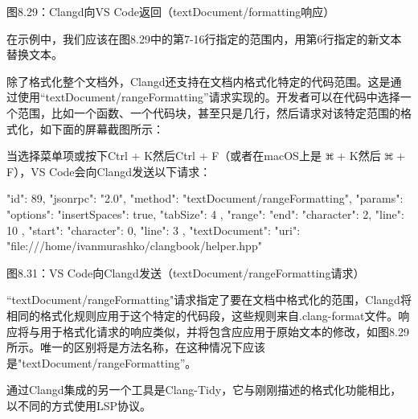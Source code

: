 \begin{center}
图8.29：Clangd向VS Code返回（textDocument/formatting响应）
\end{center}

在示例中，我们应该在图8.29中的第7-16行指定的范围内，用第6行指定的新文本替换文本。


除了格式化整个文档外，Clangd还支持在文档内格式化特定的代码范围。这是通过使用“textDocument/rangeFormatting”请求实现的。开发者可以在代码中选择一个范围，比如一个函数、一个代码块，甚至只是几行，然后请求对该特定范围的格式化，如下面的屏幕截图所示：


当选择菜单项或按下Ctrl + K然后Ctrl + F（或者在macOS上是 \includegraphics[width=0.02\textwidth]{content/part2/chapter8/images/3.png} + K然后 \includegraphics[width=0.02\textwidth]{content/part2/chapter8/images/3.png} + F），VS Code会向Clangd发送以下请求：

\begin{shell}
{
  "id": 89,
  "jsonrpc": "2.0",
  "method": "textDocument/rangeFormatting",
  "params": {
    "options": {
      "insertSpaces": true,
      "tabSize": 4
    },
    "range": {
      "end": {
        "character": 2,
        "line": 10
      },
      "start": {
        "character": 0,
        "line": 3
      }
    },
    "textDocument": {
      "uri": "file:///home/ivanmurashko/clangbook/helper.hpp"
    }
  }
}
\end{shell}

\begin{center}
图8.31：VS Code向Clangd发送（textDocument/rangeFormatting请求）
\end{center}

“textDocument/rangeFormatting"请求指定了要在文档中格式化的范围，Clangd将相同的格式化规则应用于这个特定的代码段，这些规则来自.clang-format文件。响应将与用于格式化请求的响应类似，并将包含应应用于原始文本的修改，如图8.29所示。唯一的区别将是方法名称，在这种情况下应该是"textDocument/rangeFormatting”。

通过Clangd集成的另一个工具是Clang-Tidy，它与刚刚描述的格式化功能相比，以不同的方式使用LSP协议。

